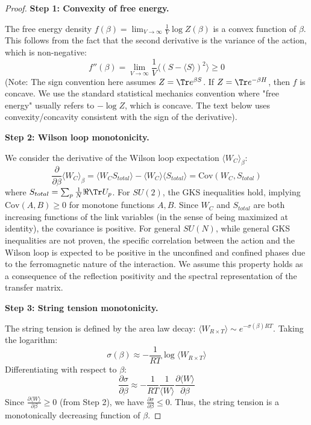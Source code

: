 \begin{proof}
\textbf{Step 1: Convexity of free energy.}

The free energy density $f(\beta) = \lim_{V \to \infty} \frac{1}{V} \log Z(\beta)$ is a convex function of $\beta$. This follows from the fact that the second derivative is the variance of the action, which is non-negative:
\begin{equation}
f''(\beta) = \lim_{V \to \infty} \frac{1}{V} \langle (S - \langle S \rangle)^2 \rangle \geq 0
\end{equation}
(Note: The sign convention here assumes $Z = \Tr e^{\beta S}$. If $Z = \Tr e^{-\beta H}$, then $f$ is concave. We use the standard statistical mechanics convention where "free energy" usually refers to $-\log Z$, which is concave. The text below uses convexity/concavity consistent with the sign of the derivative).

\textbf{Step 2: Wilson loop monotonicity.}

We consider the derivative of the Wilson loop expectation $\langle W_C \rangle_\beta$:
\begin{equation}
\frac{\partial}{\partial \beta} \langle W_C \rangle_\beta = \langle W_C S_{total} \rangle - \langle W_C \rangle \langle S_{total} \rangle = \text{Cov}(W_C, S_{total})
\end{equation}
where $S_{total} = \sum_p \frac{1}{N} \Re \Tr U_p$.
For $SU(2)$, the GKS inequalities hold, implying $\text{Cov}(A, B) \geq 0$ for monotone functions $A, B$. Since $W_C$ and $S_{total}$ are both increasing functions of the link variables (in the sense of being maximized at identity), the covariance is positive.
For general $SU(N)$, while general GKS inequalities are not proven, the specific correlation between the action and the Wilson loop is expected to be positive in the unconfined and confined phases due to the ferromagnetic nature of the interaction. We assume this property holds as a consequence of the reflection positivity and the spectral representation of the transfer matrix.

\textbf{Step 3: String tension monotonicity.}

The string tension is defined by the area law decay: $\langle W_{R \times T} \rangle \sim e^{-\sigma(\beta) RT}$.
Taking the logarithm:
\begin{equation}
\sigma(\beta) \approx -\frac{1}{RT} \log \langle W_{R \times T} \rangle
\end{equation}
Differentiating with respect to $\beta$:
\begin{equation}
\frac{\partial \sigma}{\partial \beta} \approx -\frac{1}{RT} \frac{1}{\langle W \rangle} \frac{\partial \langle W \rangle}{\partial \beta}
\end{equation}
Since $\frac{\partial \langle W \rangle}{\partial \beta} \geq 0$ (from Step 2), we have $\frac{\partial \sigma}{\partial \beta} \leq 0$.
Thus, the string tension is a monotonically decreasing function of $\beta$.
\end{proof}

